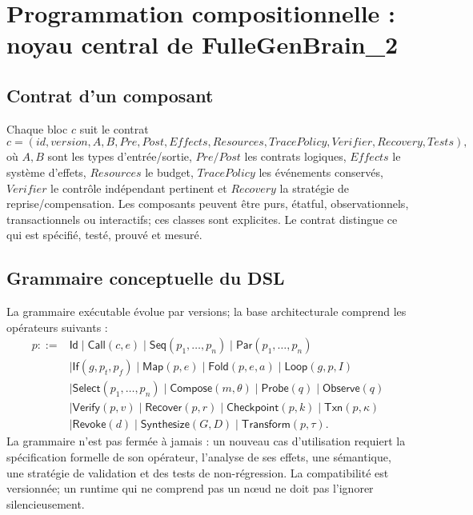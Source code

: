 \documentclass[11pt,a4paper]{article}
\begin{document}
\section{Programmation compositionnelle : noyau central de FulleGenBrain\_2}
\subsection{Contrat d'un composant}
Chaque bloc $c$ suit le contrat
\[
c=(id,version,A,B,Pre,Post,Effects,Resources,TracePolicy,Verifier,Recovery,Tests),
\]
où $A,B$ sont les types d'entrée/sortie, $Pre/Post$ les contrats logiques, $Effects$ le système d'effets, $Resources$ le budget, $TracePolicy$ les événements conservés, $Verifier$ le contrôle indépendant pertinent et $Recovery$ la stratégie de reprise/compensation. Les composants peuvent être purs, étatful, observationnels, transactionnels ou interactifs; ces classes sont explicites. Le contrat distingue ce qui est spécifié, testé, prouvé et mesuré.

\subsection{Grammaire conceptuelle du DSL}
La grammaire exécutable évolue par versions; la base architecturale comprend les opérateurs suivants :
\begin{align*}
p ::= {}& \mathsf{Id}\mid\mathsf{Call}(c,e)\mid\mathsf{Seq}(p_1,\dots,p_n)\mid\mathsf{Par}(p_1,\dots,p_n)\\
&\mid\mathsf{If}(g,p_t,p_f)\mid\mathsf{Map}(p,e)\mid\mathsf{Fold}(p,e,a)\mid\mathsf{Loop}(g,p,I)\\
&\mid\mathsf{Select}(p_1,\ldots,p_n)\mid\mathsf{Compose}(m,\theta)\mid\mathsf{Probe}(q)\mid\mathsf{Observe}(q)\\
&\mid\mathsf{Verify}(p,v)\mid\mathsf{Recover}(p,r)\mid\mathsf{Checkpoint}(p,k)\mid\mathsf{Txn}(p,\kappa)\\
&\mid\mathsf{Revoke}(d)\mid\mathsf{Synthesize}(G,D)\mid\mathsf{Transform}(p,\tau).
\end{align*}
La grammaire n'est pas fermée à jamais : un nouveau cas d'utilisation requiert la spécification formelle de son opérateur, l'analyse de ses effets, une sémantique, une stratégie de validation et des tests de non-régression. La compatibilité est versionnée; un runtime qui ne comprend pas un nœud ne doit pas l'ignorer silencieusement.
\end{document}
